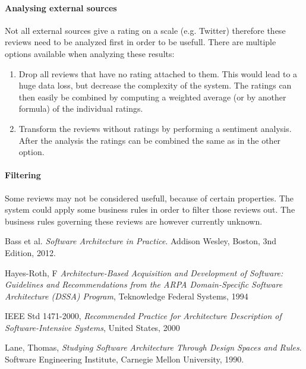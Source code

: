 \documentclass{article}
\begin{document}
\paragraph{Analysing external sources}
Not all external sources give a rating on a scale (e.g. Twitter) therefore these reviews need to be analyzed first in order to be usefull. There are multiple options available when analyzing these results:
\begin{enumerate}
\item Drop all reviews that have no rating attached to them. This would lead to a huge data loss, but decrease the complexity of the system. The ratings can then easily be combined by computing a weighted average (or by another formula) of the individual ratings.
\item Transform the reviews without ratings by performing a sentiment analysis. After the analysis the ratings can be combined the same as in the other option.
\end{enumerate}

\paragraph{Filtering}
Some reviews may not be considered usefull, because of certain properties. The system could apply some business rules in order to filter those reviews out. The business rules governing these reviews are however currently unknown. 


\begin{thebibliography}{9}

Bass et al.
  \emph{Software Architecture in Practice}.
  Addison Wesley, Boston,
  3nd Edition,
  2012.

 Hayes-Roth, F
 \emph{Architecture-Based Acquisition and Development of Software: Guidelines and Recommendations from the ARPA Domain-Speciﬁc
 Software Architecture (DSSA) Program},
 Teknowledge Federal Systems,
 1994

 IEEE Std 1471-2000,
 \emph{Recommended Practice for Architecture Description of Software-Intensive Systems},
 United States,
 2000

  Lane, Thomas,
  \emph{Studying Software Architecture Through Design Spaces and Rules}.
  Software Engineering Institute, Carnegie Mellon University,
  1990.

\end{thebibliography}
\end{document}
